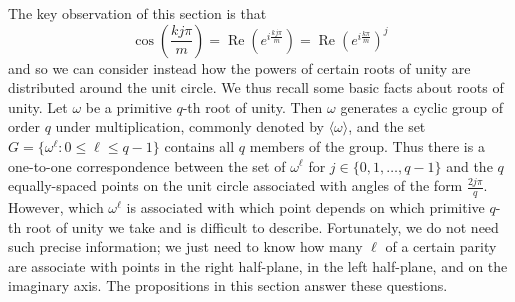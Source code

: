 \documentclass{amsart}
\renewcommand{\Re}{\operatorname{Re}}
\theoremstyle{definition}
\theoremstyle{remark}
\begin{document}






The key observation of this section is that 
\[
\cos\left( 
 \frac{kj \pi}{m}\right) = \Re \left(e^{i\frac{ k j \pi}{m}} \right) =\Re \left( e^{i \frac{k \pi}{m}} \right)^j
 \]
 and so we can consider instead how the powers of certain roots of unity are distributed around the unit circle.  We thus recall some basic facts about roots of unity. Let $\omega$ be a primitive $q$-th root of unity. Then $\omega$ generates a cyclic group of order $q$ under multiplication, commonly denoted by $\langle \omega \rangle$, and the set $G = \{\omega^\ell : 0 \leq \ell \leq q-1\}$ contains all $q$ members of the group.  Thus there is a one-to-one correspondence between the set of $\omega^\ell$ for $j \in \{ 0, 1, \ldots, q-1\}$ and the $q$ equally-spaced points on the unit circle associated with angles of the form $\frac{2j\pi}{q}$. However, which $\omega^\ell$ is associated with which point depends on which primitive $q$-th root of unity we take and is difficult to describe. Fortunately, we do not need such precise information; we just need to know how many $\ell$ of a certain parity are associate with points in the right half-plane, in the left half-plane, and on the imaginary axis. The propositions in this section answer these questions. 
\end{document}
